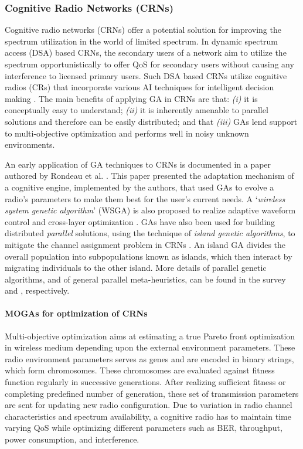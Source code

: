 \documentclass[journal]{IEEEtran}
\begin{document}
\vspace{2mm} 
\subsubsection{Cognitive Radio Networks (CRNs)}

Cognitive radio networks (CRNs) offer a potential solution for improving the spectrum utilization in the world of limited spectrum. In dynamic spectrum access (DSA) based CRNs, the secondary users of a network aim to utilize the spectrum opportunistically to offer QoS for secondary users without causing any interference to licensed primary users. Such DSA based CRNs utilize cognitive radios (CRs) that incorporate various AI techniques for intelligent decision making \cite{qadir2013artificial}. The main benefits of applying GA in CRNs are that: \emph{(i)} it is conceptually easy to understand; \emph{(ii)} it is inherently amenable to parallel solutions and therefore can be easily distributed; and that \emph{(iii)} GAs lend support to multi-objective optimization and performs well in noisy unknown environments. 

An early application of GA techniques to CRNs is documented in a paper authored by Rondeau et al. \cite{rondeau2004cognitive}. This paper presented the adaptation mechanism of a cognitive engine, implemented by the authors, that used GAs to evolve a radio's parameters to make them best for the user's current needs. A `\textit{wireless system genetic algorithm}' (WSGA) is also proposed to realize adaptive waveform control and cross-layer optimization \cite{rondeau2004cognitive}. GAs have also been used for building distributed \emph{parallel} solutions, using the technique of \emph{island genetic algorithms}, to mitigate the channel assignment problem in CRNs \cite{friend2008architecture}. An island GA divides the overall population into subpopulations known as islands, which then interact by migrating individuals to the other island. More details of parallel genetic algorithms, and of general parallel meta-heuristics, can be found in the survey \cite{alba1999survey} and \cite{alba2005parallel}, respectively.

\vspace{2mm}
\paragraph{MOGAs for optimization of CRNs}

Multi-objective optimization aims at estimating a true Pareto front optimization in wireless medium depending upon the external environment parameters. These radio environment parameters serves as genes and are encoded in binary strings, which form chromosomes. These chromosomes are evaluated against fitness function regularly in successive generations. After realizing sufficient fitness or completing predefined number of generation, these set of transmission parameters are sent for updating new radio configuration. Due to variation in radio channel characteristics and spectrum availability, a cognitive radio has to maintain time varying QoS while optimizing different parameters such as BER, throughput, power consumption, and interference. 
\end{document}
